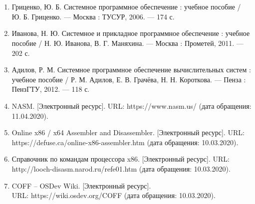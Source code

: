\chapter*{}

\begin{enumerate}
	\item{Гриценко, Ю. Б. Системное программное обеспечение : учебное пособие / Ю. Б. Гриценко. — Москва : ТУСУР, 2006. --- 174 с.}
	\item{Иванова, Н. Ю. Системное и прикладное программное обеспечение : учебное пособие / Н. Ю. Иванова, В. Г. Маняхина. --- Москва : Прометей, 2011. --- 202 с.}
	\item{Адилов, Р. М. Системное программное обеспечение вычислительных систем : учебное пособие / Р. М. Адилов, Е. В. Грачёва, Н. Н. Короткова. --- Пенза : ПензГТУ, 2012. --- 118 с.}
	\item{NASM. [Электронный ресурс]. URL: https://www.nasm.us/ (дата обращения: 11.04.2020).}
	\item{Online x86 / x64 Assembler and Disassembler. [Электронный ресурс]. URL: https://defuse.ca/online-x86-assembler.htm (дата обращения: 10.03.2020).}
	\item{Справочник по командам процессора x86. [Электронный ресурс]. URL: http://looch-disasm.narod.ru/refe01.htm (дата обращения: 10.03.2020).}
	\item{COFF – OSDev Wiki. [Электронный ресурс]. 
		\\ URL: https://wiki.osdev.org/COFF (дата обращения: 10.03.2020).}
\end{enumerate}
